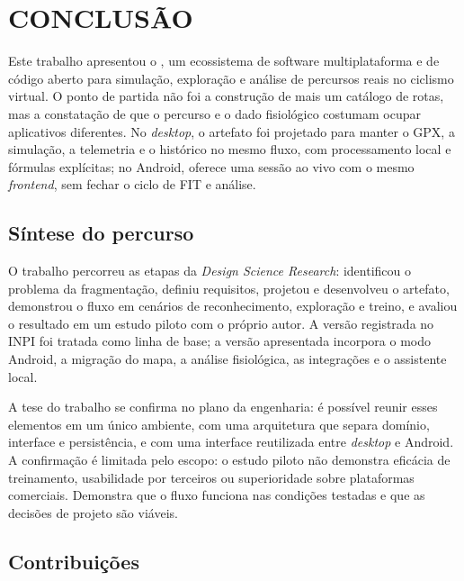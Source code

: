 
\chapter{CONCLUSÃO}
\label{cap:conclusao}

Este trabalho apresentou o \argus{}, um ecossistema de software multiplataforma
e de código aberto para simulação, exploração e análise de percursos reais no
ciclismo virtual. O ponto de partida não foi a construção de mais um catálogo de
rotas, mas a constatação de que o percurso e o dado fisiológico costumam ocupar
aplicativos diferentes. No \textit{desktop}, o artefato foi projetado para
manter o GPX, a simulação, a telemetria e o histórico no mesmo fluxo, com
processamento local e fórmulas explícitas; no Android, oferece uma sessão ao
vivo com o mesmo \textit{frontend}, sem fechar o ciclo de FIT e análise.

\section{Síntese do percurso}
\label{sec:sintese-final}

O trabalho percorreu as etapas da \textit{Design Science Research}: identificou
o problema da fragmentação, definiu requisitos, projetou e desenvolveu o
artefato, demonstrou o fluxo em cenários de reconhecimento, exploração e treino,
e avaliou o resultado em um estudo piloto com o próprio autor. A versão
registrada no INPI foi tratada como linha de base; a versão apresentada incorpora
o modo Android, a migração do mapa, a análise fisiológica, as integrações e o
assistente local.

A tese do trabalho se confirma no plano da engenharia: é possível reunir esses
elementos em um único ambiente, com uma arquitetura que separa domínio,
interface e persistência, e com uma interface reutilizada entre \textit{desktop}
e Android. A confirmação é limitada pelo escopo: o estudo piloto não demonstra
eficácia de treinamento, usabilidade por terceiros ou superioridade sobre
plataformas comerciais. Demonstra que o fluxo funciona nas condições testadas e
que as decisões de projeto são viáveis.

\section{Contribuições}
\label{sec:contribuicoes}

